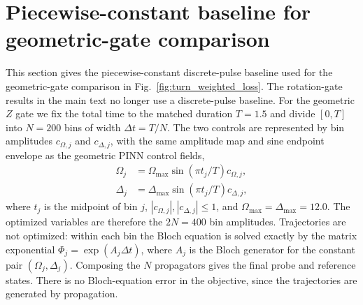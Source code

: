 \documentclass[aps,prx,reprint,superscriptaddress,nofootinbib,longbibliography,floatfix,showkeys]{revtex4-2}
\begin{document}
\section{Piecewise-constant baseline for geometric-gate comparison}
\label{supp:discrete_pulse}

This section gives the piecewise-constant discrete-pulse baseline used for
the geometric-gate comparison in Fig.~\ref{fig:turn_weighted_loss}.  The
rotation-gate results in the main text no longer use a discrete-pulse
baseline.  For the geometric $Z$ gate we fix the total time to the matched
duration $T=1.5$ and divide $[0,T]$ into $N=200$ bins of width
$\Delta t=T/N$.  The two controls are represented by bin amplitudes
$c_{\Omega,j}$ and $c_{\Delta,j}$, with the same amplitude map and sine
endpoint envelope as the geometric PINN control fields,
\begin{equation}
\begin{aligned}
    \Omega_j&=\Omega_{\max}\sin(\pi t_j/T)c_{\Omega,j},\\
    \Delta_j&=\Delta_{\max}\sin(\pi t_j/T)c_{\Delta,j},
\end{aligned}
\end{equation}
where $t_j$ is the midpoint of bin $j$, $|c_{\Omega,j}|,|c_{\Delta,j}|\leq1$,
and $\Omega_{\max}=\Delta_{\max}=12.0$.  The optimized variables are
therefore the $2N=400$ bin amplitudes.  Trajectories are not optimized:
within each bin the Bloch equation is solved exactly by the matrix
exponential $\Phi_j=\exp(A_j\Delta t)$, where $A_j$ is the Bloch generator
for the constant pair $(\Omega_j,\Delta_j)$.  Composing the $N$ propagators
gives the final probe and reference states.  There is no Bloch-equation
error in the objective, since the trajectories are generated by propagation.
\end{document}
